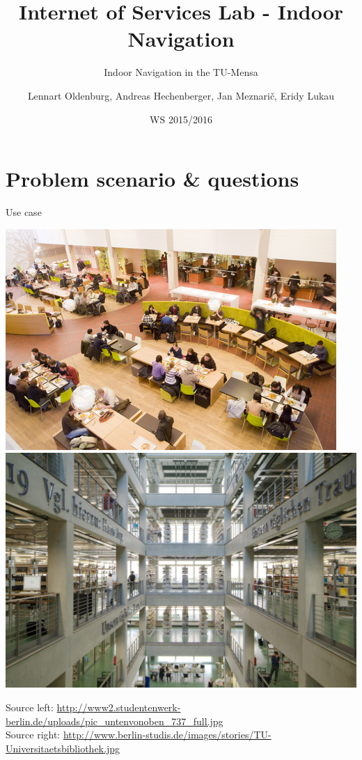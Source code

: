 \documentclass[11pt]{beamer}
\title{Internet of Services Lab - Indoor Navigation}
\subtitle{\small{Indoor Navigation in the TU-Mensa}}
\author[Oldenburg, Hechenberger, Meznarič, Lukau]{{Lennart Oldenburg, Andreas Hechenberger, Jan Meznarič, Eridy Lukau}}
\institute[TU Berlin]{Department of Telecommunication Systems Service-centric Networking 
\\ Technische Universität Berlin}
\date[WS 2015/2016]{WS 2015/2016}
\newcounter{currentOutline}
\begin{document}
\begin{frame}[plain]
    \titlepage
\end{frame}





\section{Problem scenario \& questions}

\begin{frame}{Use case}

	\vspace{1cm}
	
    \begin{center}

        \includegraphics[width=.5\textwidth]{mensa}
        \includegraphics[width=.5\textwidth]{Bibliothek}
    
    \end{center}

	\vspace{1cm}
    
    \tiny{Source left: \url{http://www2.studentenwerk-berlin.de/uploads/pic_untenvonoben_737_full.jpg}}\\
    \tiny{Source right: \url{http://www.berlin-studis.de/images/stories/TU-Universitaetsbibliothek.jpg}}

\end{frame}
\end{document}
